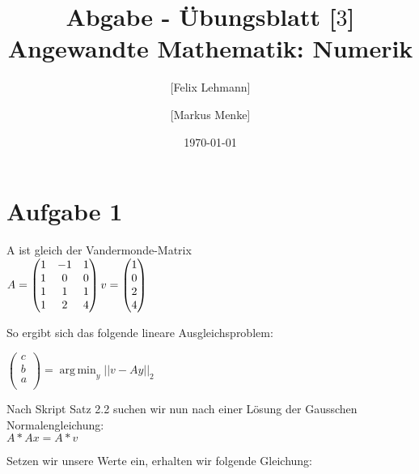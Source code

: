 \documentclass[10pt,a4paper]{article}
\DeclareMathOperator*{\argmin}{arg\,min}
\begin{document}
\title{Abgabe - Übungsblatt [$3$]\\
\small{Angewandte Mathematik: Numerik}}
\author{ [Felix Lehmann] \and [Markus Menke]}
\date{\today}
\maketitle

\section*{Aufgabe 1}
A ist gleich der Vandermonde-Matrix\\
$A = \begin{pmatrix}
 1 & -1 & 1 \\
 1 & 0  & 0 \\
 1 & 1  & 1 \\
 1 & 2  & 4 \\
\end{pmatrix}\\
v = \begin{pmatrix}
    1 \\
    0 \\
    2 \\
    4 \\
\end{pmatrix}$

So ergibt sich das folgende lineare Ausgleichsproblem:

$\begin{pmatrix}
    c \\
    b \\
    a \\
\end{pmatrix} = \argmin_y ||v-Ay||_2$

Nach Skript Satz 2.2 suchen wir nun nach einer Lösung der Gausschen Normalengleichung: \\

$A* Ax = A* v$

Setzen wir unsere Werte ein, erhalten wir folgende Gleichung:\\
\end{document}
